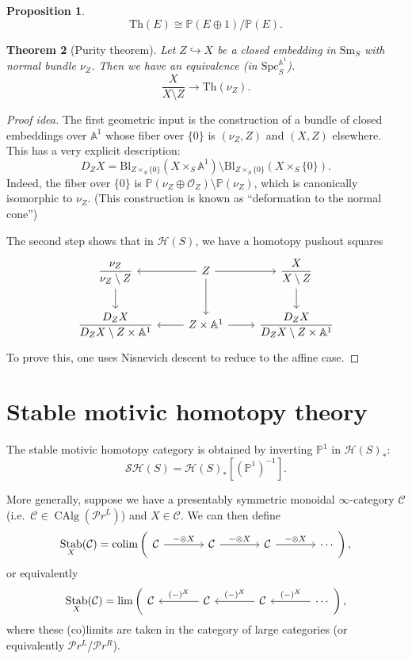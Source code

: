 \documentclass{shortart}
\newtheorem{thm}{Theorem}[section]
\newtheorem{prop}[thm]{Proposition}
\theoremstyle{definition}
\newcommand\Sm{\mathrm{Sm}}
\newcommand\Spc{\mathrm{Spc}}
\newcommand\Th{\mathrm{Th}}
\newcommand\SH{\mathcal{SH}}
\renewcommand\H{\mathcal{H}}
\renewcommand\P{\mathbb{P}}
\newcommand\A{\mathbb{A}}
\newcommand\Bl{\mathrm{Bl}}
\newcommand\PrL{\mathcal{P}r^L}
\newcommand\PrR{\mathcal{P}r^R}
\DeclareMathOperator\CAlg{CAlg}
\DeclareMathOperator\Stab{Stab}
\DeclareMathOperator*\colim{colim}
\begin{document}
\begin{prop}
  \[  
    \Th(E) \cong \P(E \oplus 1)/\P(E).
  \]
\end{prop}

\begin{thm}[Purity theorem]
  Let $Z \hookrightarrow X$ be a closed embedding in $\Sm_S$ with normal bundle $\nu_Z$. Then we have an equivalence (in $\Spc_S^{\A^1}$).
  \[
    \frac{X}{X \setminus Z} \to \Th(\nu_Z).
  \]
\end{thm}

\begin{proof}[Proof idea]
  The first geometric input is the construction of a bundle of closed embeddings over $\A^1$ whose fiber over $\{0\}$ is $(\nu_Z, Z)$ and $(X, Z)$ elsewhere. This has a very explicit description:
  \[
    D_ZX = \Bl_{Z \times_S \{0\}} (X \times_S \A^1) \setminus \Bl_{Z \times_S \{0\}} (X \times_S \{0\}).
  \]
  Indeed, the fiber over $\{0\}$ is $\P(\nu_Z \oplus \mathcal{O}_Z) \setminus \P(\nu_Z)$, which is canonically isomorphic to $\nu_Z$. (This construction is known as ``deformation to the normal cone'')

  The second step shows that in $\H(S)$, we have a homotopy pushout squares
  \[
    \begin{tikzcd}
      \dfrac{\nu_Z}{\nu_Z \setminus Z} \ar[d] & Z \ar[r] \ar[l] \ar[d] & \dfrac{X}{X \setminus Z} \ar[d]\\
      \dfrac{D_ZX}{D_ZX \setminus Z \times \A^1} & Z \times \A^1 \ar[l] \ar[r] & \dfrac{D_ZX}{D_Z X\setminus Z \times \A^1}
    \end{tikzcd}
  \]
  To prove this, one uses Nisnevich descent to reduce to the affine case.
\end{proof}

\section{Stable motivic homotopy theory}\label{chapter:stable}
The stable motivic homotopy category is obtained by inverting $\P^1$ in $\H(S)_*$:
\[
  \SH(S) = \H(S)_*[(\P^1)^{-1}].
\]

More generally, suppose we have a presentably symmetric monoidal $\infty$-category $\mathcal{C}$ (i.e.\ $\mathcal{C} \in \CAlg(\PrL)$) and $X \in \mathcal{C}$. We can then define
\[
  \Stab_X(\mathcal{C}) = \colim \left(\begin{tikzcd}[column sep=large]
      \mathcal{C} \ar[r, "-\otimes X"] &
      \mathcal{C} \ar[r, "-\otimes X"] &
      \mathcal{C} \ar[r, "-\otimes X"] &
      \cdots
  \end{tikzcd}\right),
\]
or equivalently
\[
  \Stab_X(\mathcal{C}) = \lim \left(\begin{tikzcd}[column sep=large]
      \mathcal{C} &
      \mathcal{C} \ar[l, "(-)^X"'] &
      \mathcal{C} \ar[l, "(-)^X"'] &
      \cdots \ar[l, "(-)^X"']
    \end{tikzcd}
  \right),
\]
where these (co)limits are taken in the category of large categories (or equivalently $\PrL$/$\PrR$).
\end{document}
